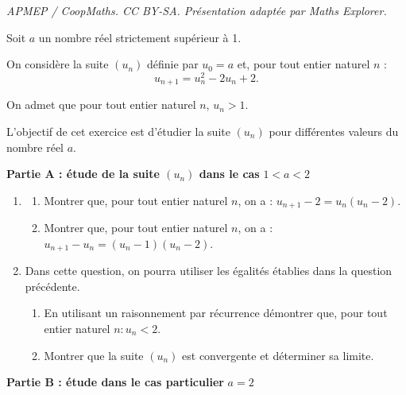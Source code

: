 \documentclass[10pt]{article}
\begin{document}
\noindent\textit{APMEP / CoopMaths. CC BY-SA. Présentation adaptée par Maths Explorer.}\par\medskip
\medskip

Soit $a$ un nombre réel strictement supérieur à 1.

On considère la suite $\left(u_n\right)$ définie par $u_0 = a$ et, pour tout entier naturel $n$ : \[u_{n+1} = u_n^2 - 2u_n + 2.\]

On admet que pour tout entier naturel $n$,\: $u_n > 1$.

L'objectif de cet exercice est d'étudier la suite $\left(u_n\right)$ pour différentes valeurs du nombre réel $a$.

\bigskip

\textbf{Partie A : étude de la suite \boldmath $\left(u_n\right)$ \unboldmath dans le cas }\boldmath$1 < a < 2$\unboldmath 

\medskip

\begin{enumerate}
\item 
	\begin{enumerate}
		\item Montrer que, pour tout entier naturel $n$, on a : $u_{n+1} - 2 = u_n\left(u_n - 2\right)$.
		\item Montrer que, pour tout entier naturel $n$, on a : $u_{n+1} - u_n = \left(u_n - 1\right)\left(u_n - 2\right)$.
	\end{enumerate}
\item Dans cette question, on pourra utiliser les égalités établies dans la question précédente.
	\begin{enumerate}
		\item En utilisant un raisonnement par récurrence démontrer que, pour tout entier naturel $n : u_n < 2$.
		\item Montrer que la suite $\left(u_n\right)$ est convergente et déterminer sa limite. 
	\end{enumerate}
\end{enumerate}
	
	
\textbf{Partie B : étude dans le cas particulier }\boldmath $a = 2$\unboldmath

\medskip
\end{document}
